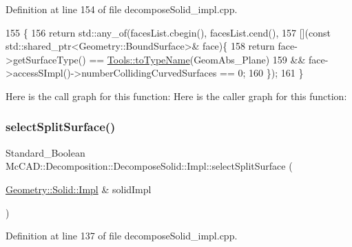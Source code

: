 Definition at line 154 of file decompose\+Solid\+\_\+impl.\+cpp.


\begin{DoxyCode}
155                                                                         \{
156     \textcolor{keywordflow}{return} std::any\_of(facesList.cbegin(), facesList.cend(),
157                        [](\textcolor{keyword}{const} std::shared\_ptr<Geometry::BoundSurface>& face)\{
158         \textcolor{keywordflow}{return} face->getSurfaceType() == \hyperlink{namespaceMcCAD_1_1Tools_a2c3c43d2878c73f69424e7b32f87bb2b}{Tools::toTypeName}(GeomAbs\_Plane)
159                 && face->accessSImpl()->numberCollidingCurvedSurfaces == 0;
160     \});
161 \}
\end{DoxyCode}
Here is the call graph for this function\+:
Here is the caller graph for this function\+:
\mbox{\label{classMcCAD_1_1Decomposition_1_1DecomposeSolid_1_1Impl_a99e2391d75cc9f871a0cb9f984b67e24}} 
\subsubsection{\texorpdfstring{select\+Split\+Surface()}{selectSplitSurface()}\hspace{0.1cm}{\footnotesize\ttfamily [1/2]}}
{\footnotesize\ttfamily Standard\+\_\+\+Boolean Mc\+C\+A\+D\+::\+Decomposition\+::\+Decompose\+Solid\+::\+Impl\+::select\+Split\+Surface (\begin{DoxyParamCaption}\item[{\hyperlink{classMcCAD_1_1Geometry_1_1Solid_1_1Impl}{Geometry\+::\+Solid\+::\+Impl} \&}]{solid\+Impl }\end{DoxyParamCaption})}



Definition at line 137 of file decompose\+Solid\+\_\+impl.\+cpp.


